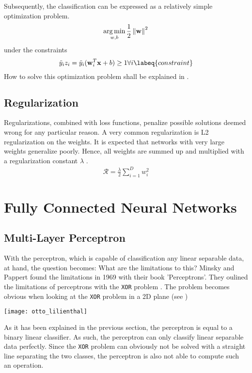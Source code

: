 Subsequently, the classification can be expressed as a relatively simple optimization problem.
\begin{align}
    \operatorname*{arg\,min}_{w, b} \frac{1}{2} \left\lVert\mathbf{w}\right\rVert^2
\end{align}
under the constraints
\begin{align}
    \tilde{y}_i z_i = \tilde{y}_i (\vec{w}_i^T \vec{x} + b) \geq 1 \forall i
    \labeq{constraint}
\end{align}
How to solve this optimization problem shall be explained in .

\subsection{Regularization}
Regularizations, combined with loss functions, penalize possible solutions deemed wrong for any particular reason.
A very common regularization is L2 regularization on the weights.
It is expected that networks with very large weights generalize poorly.
Hence, all weights are summed up and multiplied with a regularization constant $\lambda$ \cite{grosse}.
\begin{align}
	\mathcal{R} = \frac{\lambda}{2} \sum_{i = 1}^D w_i^2
\end{align}

\section[Fully Connected NNs]{Fully Connected Neural Networks}
\subsection{Multi-Layer Perceptron}
With the perceptron, which is capable of classification any linear separable data, at hand, the question becomes: What are the limitations to this?
Minsky and Pappert found the limitations in 1969 with their book 'Perceptrons'.
They oulined the limitations of perceptrons with the \lstinline|XOR| problem \cite{perceptron}.
The problem becomes obvious when looking at the \lstinline|XOR| problem in a 2D plane (see )
\begin{marginfigure}
    \texttt{[image: otto\_lilienthal]}
    \caption[]{\lstinline|OR| and \lstinline|XOR| operations visualized. The \lstinline|XOR| problem cannot be solved by drawing a single line.}
\end{marginfigure}

As it has been explained in the previous section, the perceptron is equal to a binary linear classifier.
As such, the perceptron can only classify linear separable data perfectly.
Since the \lstinline|XOR| problem can obviously not be solved with a straight line separating the two classes, the perceptron is also not able to compute such an operation. 

